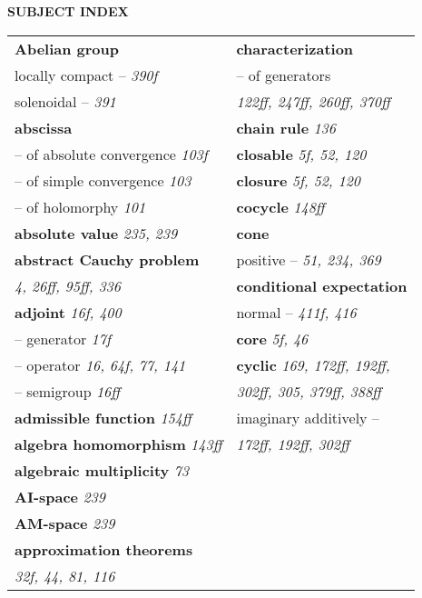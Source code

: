 \documentclass{article}
\begin{document}
\begin{center}
\textbf{\Large SUBJECT INDEX}
\end{center}

\vspace{1cm}

\begin{longtable}{p{}p{}}

\textbf{Abelian group} & \textbf{characterization} \\
\quad locally compact -- \textit{390f} & \quad -- of generators \\
\quad solenoidal -- \textit{391} & \quad\quad \textit{122ff, 247ff, 260ff, 370ff} \\
\textbf{abscissa} & \textbf{chain rule} \textit{136} \\
\quad -- of absolute convergence \textit{103f} & \textbf{closable} \textit{5f, 52, 120} \\
\quad -- of simple convergence \textit{103} & \textbf{closure} \textit{5f, 52, 120} \\
\quad -- of holomorphy \textit{101} & \textbf{cocycle} \textit{148ff} \\
\textbf{absolute value} \textit{235, 239} & \textbf{cone} \\
\textbf{abstract Cauchy problem} & \quad positive -- \textit{51, 234, 369} \\
\quad \textit{4, 26ff, 95ff, 336} & \textbf{conditional expectation} \\
\textbf{adjoint} \textit{16f, 400} & \quad normal -- \textit{411f, 416} \\
\quad -- generator \textit{17f} & \textbf{core} \textit{5f, 46} \\
\quad -- operator \textit{16, 64f, 77, 141} & \textbf{cyclic} \textit{169, 172ff, 192ff,} \\
\quad -- semigroup \textit{16ff} & \quad\quad \textit{302ff, 305, 379ff, 388ff} \\
\textbf{admissible function} \textit{154ff} & \quad imaginary additively -- \\
\textbf{algebra homomorphism} \textit{143ff} & \quad\quad \textit{172ff, 192ff, 302ff} \\
\textbf{algebraic multiplicity} \textit{73} & \\
\textbf{AI-space} \textit{239} & \\
\textbf{AM-space} \textit{239} & \\
\textbf{approximation theorems} & \\
\quad \textit{32f, 44, 81, 116} & \\

\end{longtable}
\end{document}
